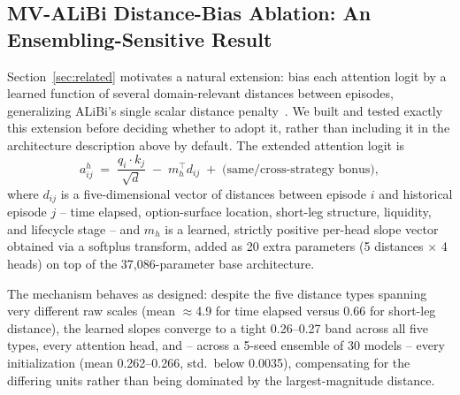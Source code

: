\documentclass[sigconf,review,anonymous]{acmart}
\begin{document}
\subsection{MV-ALiBi Distance-Bias Ablation: An Ensembling-Sensitive Result}
\label{sec:mvalibi-ablation}
Section~\ref{sec:related} motivates a natural extension: bias each attention logit by a learned function of several domain-relevant distances between episodes, generalizing ALiBi's single scalar distance penalty~\cite{press2022alibi}. We built and tested exactly this extension before deciding whether to adopt it, rather than including it in the architecture description above by default. The extended attention logit is
\[
a_{ij}^{h} \;=\; \frac{q_i \cdot k_j}{\sqrt{d}} \;-\; m_h^{\top} d_{ij} \;+\; \text{(same/cross-strategy bonus)},
\]
where $d_{ij}$ is a five-dimensional vector of distances between episode $i$ and historical episode $j$ -- time elapsed, option-surface location, short-leg structure, liquidity, and lifecycle stage -- and $m_h$ is a learned, strictly positive per-head slope vector obtained via a softplus transform, added as 20 extra parameters (5 distances $\times$ 4 heads) on top of the 37{,}086-parameter base architecture.

The mechanism behaves as designed: despite the five distance types spanning very different raw scales (mean $\approx$4.9 for time elapsed versus 0.66 for short-leg distance), the learned slopes converge to a tight 0.26--0.27 band across all five types, every attention head, and -- across a 5-seed ensemble of 30 models -- every initialization (mean 0.262--0.266, std.\ below 0.0035), compensating for the differing units rather than being dominated by the largest-magnitude distance.
\end{document}
